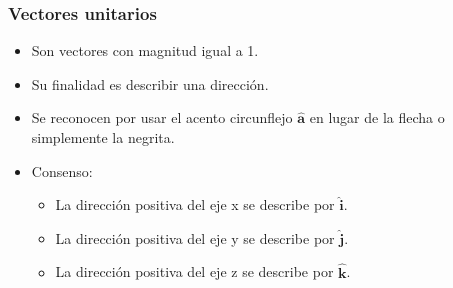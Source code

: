 \documentclass[
    aspectratio=169, %
    ]{beamer}
\newcommand{\vh}[1]{\hat{\bm{{#1}}}}
\begin{document}
\begin{frame}
	\frametitle{Vectores unitarios}\pause
	\begin{itemize}
		\item Son vectores con magnitud igual a 1.\pause
		\item Su finalidad es describir una dirección.\pause
		\item Se reconocen por usar el acento circunflejo $\vh{a}$ en lugar de la flecha o simplemente la negrita.\pause
		\item Consenso:
		\begin{itemize}
			\item La dirección positiva del eje x se describe por $\vh{i}$.
			\item La dirección positiva del eje y se describe por $\vh{j}$.
			\item La dirección positiva del eje z se describe por $\vh{k}$.
		\end{itemize}
	\end{itemize}
\end{frame}
\end{document}
